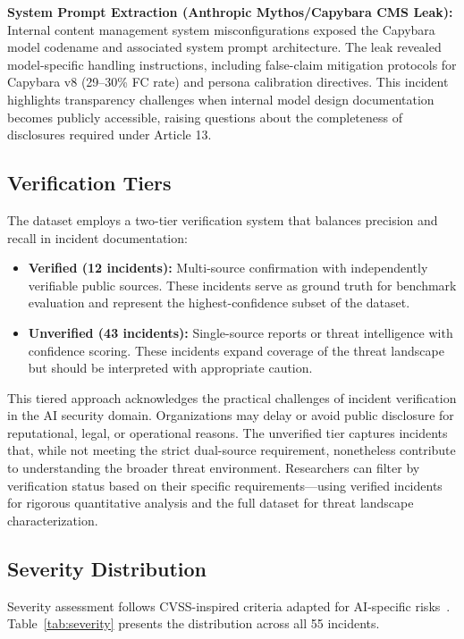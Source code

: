 \documentclass[10pt,conference]{IEEEtran}
\begin{document}
\textbf{System Prompt Extraction (Anthropic Mythos/Capybara CMS Leak):} Internal content management system misconfigurations exposed the Capybara model codename and associated system prompt architecture. The leak revealed model-specific handling instructions, including false-claim mitigation protocols for Capybara v8 (29--30\% FC rate) and persona calibration directives. This incident highlights transparency challenges when internal model design documentation becomes publicly accessible, raising questions about the completeness of disclosures required under Article 13.

\subsection{Verification Tiers}

The dataset employs a two-tier verification system that balances precision and recall in incident documentation:

\begin{itemize}
    \item \textbf{Verified (12 incidents):} Multi-source confirmation with independently verifiable public sources. These incidents serve as ground truth for benchmark evaluation and represent the highest-confidence subset of the dataset.
    \item \textbf{Unverified (43 incidents):} Single-source reports or threat intelligence with confidence scoring. These incidents expand coverage of the threat landscape but should be interpreted with appropriate caution.
\end{itemize}

This tiered approach acknowledges the practical challenges of incident verification in the AI security domain. Organizations may delay or avoid public disclosure for reputational, legal, or operational reasons. The unverified tier captures incidents that, while not meeting the strict dual-source requirement, nonetheless contribute to understanding the broader threat environment. Researchers can filter by verification status based on their specific requirements---using verified incidents for rigorous quantitative analysis and the full dataset for threat landscape characterization.

\subsection{Severity Distribution}

Severity assessment follows CVSS-inspired criteria adapted for AI-specific risks~\cite{first2019cvss}. Table~\ref{tab:severity} presents the distribution across all 55 incidents.
\end{document}
